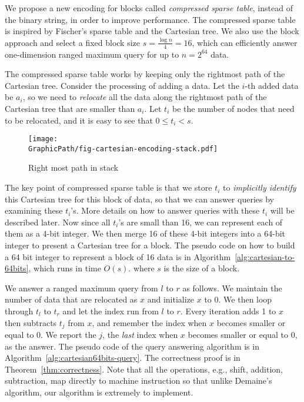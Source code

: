 We propose a new encoding for blocks called {\em compressed sparse
  table}, instead of the binary string, in order to improve
performance.  The compressed sparse table is inspired by Fischer's
sparse table and the Cartesian tree.  We also use the block approach
and select a fixed block size $s = {{\frac{\log n}{4}}} = 16$, which
can efficiently answer one-dimension ranged maximum query for up to $n
= 2^{64}$ data.

The compressed sparse table works by keeping only the {\rm rightmost}
path of the Cartesian tree.  Consider the processing of adding a data.
Let the $i$-th added data be $a_i$, so we need to {\em relocate} all
the data along the rightmost path of the Cartesian tree that are
smaller than $a_i$.  Let $t_i$ be the number of nodes that need to be
relocated, and it is easy to see that $0 \le t_i < s$.

\begin{figure}[!thb]
  \centering
  \texttt{[image: \\GraphicPath/fig-cartesian-encoding-stack.pdf]}
  \caption{Right most path in stack}
  \label{fig:interval-cartesian}
\end{figure}

The key point of compressed sparse table is that we store $t_i$ to
{\em implicitly identify} this Cartesian tree for this block of data,
so that we can answer queries by examining these $t_i$'s.  More
details on how to answer queries with these $t_i$ will be described
later.  Now since all $t_i$'s are small than 16, we can represent each
of them as a 4-bit integer.  We then merge 16 of these 4-bit integers
into a 64-bit integer to present a Cartesian tree for a block.  The
pseudo code on how to build a 64 bit integer to represent a block of
16 data is in Algorithm~\ref{alg:cartesian-to-64bits}, which runs in
time $O(s)$. where $s$ is the size of a block.



We answer a ranged maximum query from $l$ to $r$ as follows.  We
maintain the number of data that are relocated as $x$ and initialize
$x$ to 0.  We then loop through $t_l$ to $t_r$ and let the index run
from $l$ to $r$.  Every iteration adds 1 to $x$ then subtracts $t_j$
from $x$, and remember the index when $x$ becomes smaller or equal to
0.  We report the $j$, the {\em last} index when $x$ becomes smaller
or equal to 0, as the answer.  The pseudo code of the query answering
algorithm is in Algorithm~\ref{alg:cartesian64bits-query}.  The
correctness proof is in Theorem~\ref{thm:correctness}.  Note that all
the operations, e.g., shift, addition, subtraction, map directly to
machine instruction so that unlike Demaine's algorithm, our algorithm
is extremely to implement.

